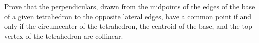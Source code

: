 Prove that the perpendiculars, drawn from the midpoints of the edges of the base of a given tetrahedron to the opposite lateral edges, have a common point if and only if the circumcenter of the tetrahedron, the centroid of the base, and the top vertex of the tetrahedron are collinear.